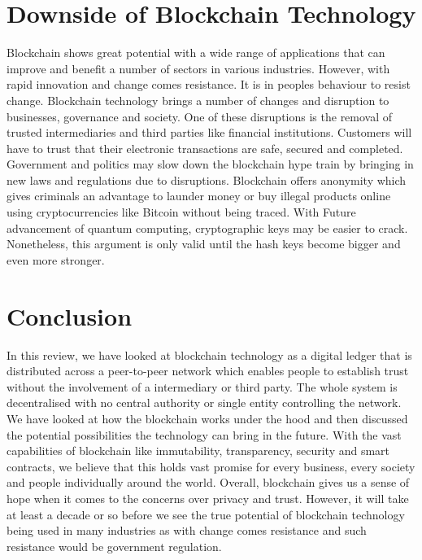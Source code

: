 \documentclass[report]{IEEEtran}
\begin{document}
\section{Downside of Blockchain Technology}
Blockchain shows great potential with a wide range of applications that can improve and benefit a number of sectors in various industries. However, with rapid innovation and change comes resistance. It is in peoples behaviour to resist change. Blockchain technology brings a number of changes and disruption to businesses, governance and society. One of these disruptions is the removal of trusted intermediaries and third parties like financial institutions. Customers will have to trust that their electronic transactions are safe, secured and completed. Government and politics may slow down the blockchain hype train by bringing in new laws and regulations due to disruptions. Blockchain offers anonymity which gives criminals an advantage to launder money or buy illegal products online using cryptocurrencies like Bitcoin without being traced. With Future advancement of quantum computing, cryptographic keys may be easier to crack. Nonetheless, this argument is only valid until the hash keys become bigger and even more stronger. 

\section{Conclusion}
In this review, we have looked at blockchain technology as a digital ledger that is distributed across a peer-to-peer network which enables people to establish trust without the involvement of a intermediary or third party. The whole system is decentralised with no central authority or single entity controlling the network. We have looked at how the blockchain works under the hood and then discussed the potential possibilities the technology can bring in the future. With the vast capabilities of blockchain like immutability, transparency, security and smart contracts, we believe that this holds vast promise for every business, every society and people individually around the world. Overall, blockchain gives us a sense of hope when it comes to the concerns over privacy and trust. However, it will take at least a decade or so before we see the true potential of blockchain technology being used in many industries as with change comes resistance and such resistance would be government regulation. 
\end{document}
